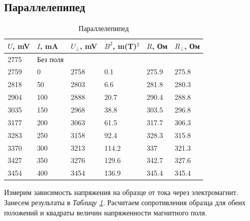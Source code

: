 \documentclass[a4paper]{article}
\begin{document}
\subsection{Параллелепипед}

\begin{table}[ht]
\begin{minipage}{0.7\textwidth}
    \centering
    \begin{tabular}{|l|l|l|l|l|l|}
    \hline
    $U$, mV & $I$, mA  & $U_{\perp}$,  mV & $B^2$,  m(T)$^2$ & $R$, Ом & $R_{\perp}$, Ом \\ \hline
    2775    & Без поля &                  &                  &         &                 \\ \hline
    2759    & 0        & 2758             & 0.1              & 275.9   & 275.8           \\ \hline
    2818    & 50       & 2803             & 6.6              & 281.8   & 280.3           \\ \hline
    2904    & 100      & 2888             & 20.7             & 290.4   & 288.8           \\ \hline
    3035    & 150      & 2968             & 38.8             & 303.5   & 296.8           \\ \hline
    3177    & 200      & 3063             & 61.5             & 317.7   & 306.3           \\ \hline
    3283    & 250      & 3158             & 92.4             & 328.3   & 315.8           \\ \hline
    3370    & 300      & 3213             & 114.2            & 337     & 321.3           \\ \hline
    3427    & 350      & 3276             & 129.6            & 342.7   & 327.6           \\ \hline
    3454    & 400      & 3454             & 136.9            & 345.4   & 345.4           \\ \hline
    \end{tabular}
    \label{table::par}
    \caption{Параллелепипед}
\end{minipage}
\begin{minipage}{0.3\textwidth}
    Измерим зависимость напряжения на образце от тока через электромагнит. Занесем результаты в \textit{Таблицу \ref{table::par}}. Расчитаем сопротивления образца для обеих положений и квадраты величин напряженности магнитного поля.
\end{minipage}
\end{table}
\end{document}

